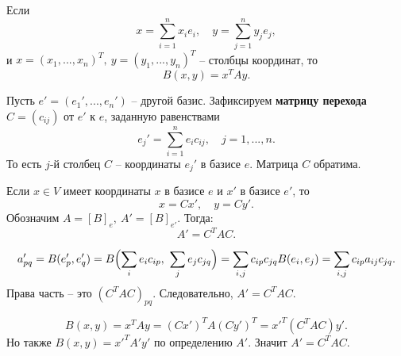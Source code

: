 \documentclass[14pt]{extreport}
\begin{document}
    \begin{thbox}
        Если
        \[
        x = \sum_{i=1}^n x_ie_i, \quad y = \sum_{j=1}^n y_je_j,
        \]
        и $x = (x_1,...,x_n)^T,\ y = (y_1,...,y_n)^T$ – столбцы координат, то
        \[
        B(x,y) = x^TAy.
        \]
    \end{thbox}

    \begin{defbox}
        Пусть $e' = (e_1',...,e_n')$ – другой базис. Зафиксируем \textbf{матрицу перехода} $C = (c_{ij})$ от $e'$ к $e$, заданную равенствами
        \[
        e_j' = \sum_{i=1}^n e_ic_{ij}, \quad j = 1,...,n.
        \]
        То есть $j$-й столбец $C$ – координаты $e_j'$ в базисе $e$. Матрица $C$ обратима.
    \end{defbox}

    \begin{thbox}
        Если $x \in V$ имеет координаты $x$ в базисе $e$ и $x'$ в базисе $e'$, то
        \[
        x = Cx', \quad y = Cy'.
        \]
        Обозначим $A = [B]_e,\ A' = [B]_{e'}$. Тогда:
        \[
        A' = C^TAC.
        \]
    \end{thbox}

    \begin{prbox}
        \[
        a_{pq}' = B(e_p', e_q') = B \Bigl( \sum_i e_ic_{ip},\ \sum_j e_jc_{jq} \Bigr) = \sum_{i,j} c_{ip}c_{jq}B(e_i,e_j) = \sum_{i,j} c_{ip}a_{ij}c_{jq}.
        \]
        Права часть – это $(C^TAC)_{pq}$. Следовательно, $A' = C^TAC$.
    \end{prbox}

    \begin{prbox}
        \[
        B(x,y) = x^TAy = (Cx')^T A (Cy')^T = x'^T (C^TAC) y'.
        \]
        Но также $B(x,y) = x'^TA'y'$ по определению $A'$. Значит $A' = C^TAC$.
    \end{prbox}
\end{document}
